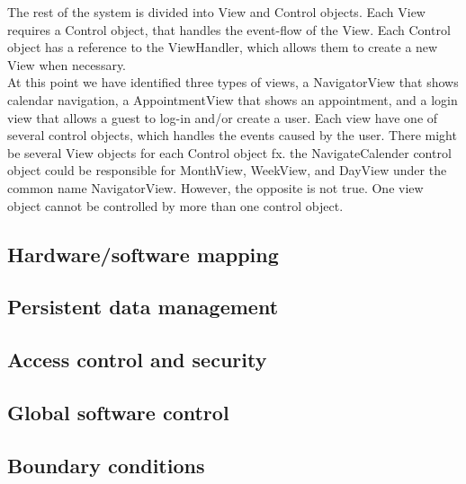 The rest of the system is divided into View and Control objects. Each View requires a Control object, that handles the event-flow of the View. Each Control object has a reference to the ViewHandler, which allows them to create a new View when necessary. \\

At this point we have identified three types of views, a NavigatorView that shows calendar navigation, a AppointmentView that shows an appointment, and a login view that allows a guest to log-in and/or create a user. Each view have one of several control objects, which handles the events caused by the user. There might be several View objects for each Control object fx. the NavigateCalender control object could be responsible for MonthView, WeekView, and DayView under the common name NavigatorView. However, the opposite is not true. One view object cannot be controlled by more than one control object. 

\subsection{Hardware/software mapping}
\subsection{Persistent data management}
\subsection{Access control and security}
\subsection{Global software control}
\subsection{Boundary conditions}
